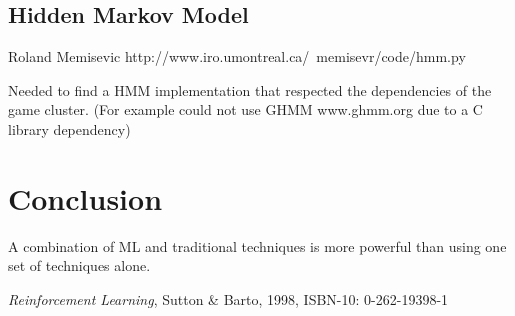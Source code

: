 \documentclass[11pt, oneside]{article}   	%
\begin{document}
\subsection*{Hidden Markov Model}
 Roland Memisevic
 http://www.iro.umontreal.ca/~memisevr/code/hmm.py

Needed to find a HMM implementation that respected the dependencies of the game cluster. (For example could not use GHMM www.ghmm.org due to a C library dependency)

\section*{Conclusion}
A combination of ML and traditional techniques is more powerful than using one set of techniques alone.

\begin{thebibliography}{1}

 \emph{Reinforcement Learning}, Sutton \& Barto, 1998, ISBN-10: 0-262-19398-1
 
  \end{thebibliography}
\end{document}
